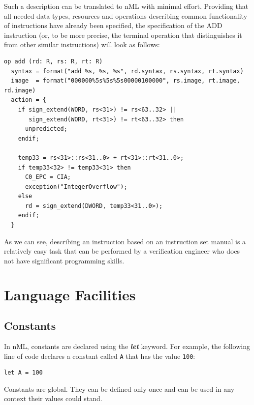 \documentclass[oneside,final,14pt]{extreport}
\begin{document}
Such a description can be translated to nML with minimal effort. Providing that
all needed data types, resources and operations describing common functionality
of instructions have already been specified, the specification of the ADD
instruction (or, to be more precise, the terminal operation that distinguishes
it from other similar instructions) will look as follows:

\begin{lstlisting}
op add (rd: R, rs: R, rt: R)
  syntax = format("add %s, %s, %s", rd.syntax, rs.syntax, rt.syntax)
  image  = format("000000%5s%5s%5s00000100000", rs.image, rt.image, rd.image)
  action = {
    if sign_extend(WORD, rs<31>) != rs<63..32> ||
       sign_extend(WORD, rt<31>) != rt<63..32> then
      unpredicted;
    endif;

    temp33 = rs<31>::rs<31..0> + rt<31>::rt<31..0>;
    if temp33<32> != temp33<31> then
      C0_EPC = CIA;
      exception("IntegerOverflow");
    else
      rd = sign_extend(DWORD, temp33<31..0>);
    endif;
  }
\end{lstlisting}

As we can see, describing an instruction based on an instruction set manual is
a relatively easy task that can be performed by a verification engineer who
does not have significant programming skills.


\chapter{Language Facilities}


\section{Constants}

In nML, constants are declared using the \textbf{\textit{let}} keyword. For example,
the following line of code declares a constant called {\tt A} that has the value {\tt 100}:

\begin{lstlisting}
let A = 100
\end{lstlisting}

Constants are global. They can be defined only once and can be used in any context
their values could stand.
\end{document}
